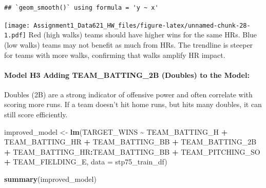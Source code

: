 \documentclass[
]{article}
\newenvironment{Shaded}{\begin{snugshade}}{\end{snugshade}}
\newcommand{\AttributeTok}[1]{\textcolor[rgb]{0.13,0.29,0.53}{#1}}
\newcommand{\FunctionTok}[1]{\textcolor[rgb]{0.13,0.29,0.53}{\textbf{#1}}}
\newcommand{\NormalTok}[1]{#1}
\newcommand{\OtherTok}[1]{\textcolor[rgb]{0.56,0.35,0.01}{#1}}
\newcommand{\SpecialCharTok}[1]{\textcolor[rgb]{0.81,0.36,0.00}{\textbf{#1}}}
\begin{document}
\begin{verbatim}
## `geom_smooth()` using formula = 'y ~ x'
\end{verbatim}

\texttt{[image: Assignment1\_Data621\_HW\_files/figure-latex/unnamed-chunk-28-1.pdf]}
Red (high walks) teams should have higher wins for the same HRs. Blue
(low walks) teams may not benefit as much from HRs. The trendline is
steeper for teams with more walks, confirming that walks amplify HR
impact.

\paragraph{Model H3 Adding TEAM\_BATTING\_2B (Doubles) to the
Model:}\label{model-h3-adding-team_batting_2b-doubles-to-the-model}

Doubles (2B) are a strong indicator of offensive power and often
correlate with scoring more runs. If a team doesn't hit home runs, but
hits many doubles, it can still score efficiently.

\begin{Shaded}
\begin{Highlighting}[]
\NormalTok{improved\_model }\OtherTok{\textless{}{-}} \FunctionTok{lm}\NormalTok{(TARGET\_WINS }\SpecialCharTok{\textasciitilde{}}\NormalTok{ TEAM\_BATTING\_H }\SpecialCharTok{+}\NormalTok{ TEAM\_BATTING\_HR }\SpecialCharTok{+}\NormalTok{ TEAM\_BATTING\_BB }\SpecialCharTok{+}\NormalTok{ TEAM\_BATTING\_2B }\SpecialCharTok{+}\NormalTok{ TEAM\_BATTING\_HR}\SpecialCharTok{:}\NormalTok{TEAM\_BATTING\_BB }\SpecialCharTok{+}\NormalTok{  TEAM\_PITCHING\_SO }\SpecialCharTok{+}\NormalTok{ TEAM\_FIELDING\_E, }
                      \AttributeTok{data =}\NormalTok{ stp75\_train\_df)}

\FunctionTok{summary}\NormalTok{(improved\_model)}
\end{Highlighting}
\end{Shaded}
\end{document}
